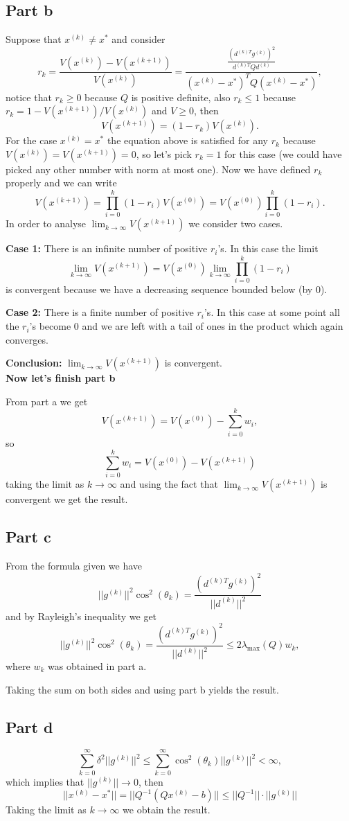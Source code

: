 \documentclass{article}
\begin{document}
\subsection*{Part b}
Suppose that $x^{(k)}\neq x^*$ and consider
\[
r_k=\frac{V(x^{(k)}) -V(x^{(k+1)})}{V(x^{(k)})}
=\frac{\frac{\left(d^{(k)T}g^{(k)}\right)^2}{d^{(k)T}Qd^{(k)}}}{(x^{(k)}-x^*)^TQ(x^{(k)}-x^*)},
\]
notice that $r_k\geq0$ because $Q$ is positive definite, also $r_k\leq 1$ because\\
$r_k=1-V(x^{(k+1)})/V(x^{(k)})$ and $V\geq 0$, then
\[
V(x^{(k+1)})=(1-r_k)V(x^{(k)}).
\]
For the case $x^{(k)}=x^*$ the equation above is satisfied for any $r_k$
because $V(x^{(k)})=V(x^{(k+1)})=0$, so let's pick $r_k=1$ for this case (we
could have picked any other number with norm at most one). Now we have defined
$r_k$ properly and we can write
\[
V(x^{(k+1)})=\prod_{i=0}^k(1-r_i)V(x^{(0)})=V(x^{(0)})\prod_{i=0}^k(1-r_i).
\]
In order to analyse $\lim_{k\to\infty}V(x^{(k+1)})$ we consider two cases.

\textbf{Case 1:} There is an infinite number of positive $r_i$'s. In this case
the limit
\[
	\lim_{k\to\infty}V(x^{(k+1)})=V(x^{(0)})\lim_{k\to\infty}\prod_{i=0}^k(1-r_i)
\]
is convergent because we have a decreasing sequence bounded below (by
0).

\textbf{Case 2:} There is a finite number of positive $r_i$'s. In this case at
some point all the $r_i$'s become 0 and we are left with a tail of ones in the
product which again converges.

\textbf{Conclusion:} $\lim_{k\to\infty}V(x^{(k+1)})$ is convergent.\\
\textbf{Now let's finish part b}

From part a we get
\[
V(x^{(k+1)})=V(x^{(0)})-\sum_{i=0}^kw_i,
\]
so
\[
\sum_{i=0}^kw_i=V(x^{(0)})-V(x^{(k+1)})
\]
taking the limit as $k\to\infty$ and using the fact that
$\lim_{k\to\infty}V(x^{(k+1)})$ is convergent we get the result.
\subsection*{Part c}
From the formula given we have
\[
||g^{(k)}||^2\cos^2(\theta_k)=\frac{(d^{(k)T}g^{(k)})^2}{||d^{(k)}||^2}
\]
and by Rayleigh's inequality we get
\[
||g^{(k)}||^2\cos^2(\theta_k)=\frac{(d^{(k)T}g^{(k)})^2}{||d^{(k)}||^2}
\leq2\lambda_{\max}(Q)w_k,
\]
where $w_k$ was obtained in part a.

Taking the sum on both sides and using part b yields the result.
\subsection*{Part d}
\[
	\sum_{k=0}^\infty \delta^2||g^{(k)}||^2\leq
	\sum_{k=0}^\infty \cos^2(\theta_k)||g^{(k)}||^2
	<\infty,
\]
which implies that $||g^{(k)}||\to 0$, then
\[
	||x^{(k)}-x^*||=||Q^{-1}(Qx^{(k)}-b)||\leq||Q^{-1}||\cdot||g^{(k)}||
\]
Taking the limit as $k\to \infty$ we obtain the result.
\end{document}
